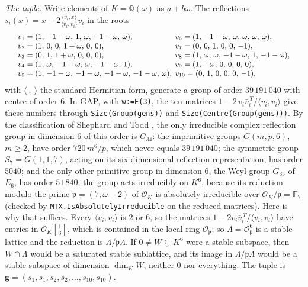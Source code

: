 \documentclass[11pt]{amsart}
\theoremstyle{definition}
\theoremstyle{remark}
\newcommand{\Q}{\mathbb Q}
\begin{document}
\emph{The tuple.} Write elements of $K=\Q(\omega)$ as $a+b\omega$. The reflections $s_i(x)=x-2\frac{\langle v_i,x\rangle}{\langle v_i,v_i\rangle}v_i$ in the roots
\[
\setlength{\arraycolsep}{2pt}\small
\begin{array}{ll}
v_1=(1,\,-1-\omega,\,1,\,\omega,\,-1-\omega,\,\omega), & v_6=(1,\,-1-\omega,\,\omega,\,\omega,\,\omega,\,\omega),\\
v_2=(1,\,0,\,0,\,1+\omega,\,0,\,0), & v_7=(0,\,0,\,1,\,0,\,0,\,-1),\\
v_3=(0,\,1,\,1+\omega,\,0,\,0,\,0), & v_8=(1,\,\omega,\,\omega,\,-1-\omega,\,1,\,-1-\omega),\\
v_4=(1,\,\omega,\,-1-\omega,\,\omega,\,-1-\omega,\,1), & v_9=(1,\,-\omega,\,0,\,0,\,0,\,0),\\
v_5=(1,\,-1-\omega,\,-1-\omega,\,-1-\omega,\,-1-\omega,\,\omega), & v_{10}=(0,\,1,\,0,\,0,\,0,\,-1),
\end{array}
\]
with $\langle\ ,\ \rangle$ the standard Hermitian form, generate a group of order $39\,191\,040$ with centre of order $6$. In GAP, with \texttt{w:=E(3)}, the ten matrices $1-2\,v_i\bar v_i^{\,T}/\langle v_i,v_i\rangle$ give these numbers through \texttt{Size(Group(gens))} and \texttt{Size(Centre(Group(gens)))}. By the classification of Shephard and Todd \cite{ShephardTodd}, the only irreducible complex reflection group in dimension $6$ of this order is $G_{34}$: the imprimitive groups $G(m,p,6)$, $m\ge2$, have order $720\,m^6/p$, which never equals $39\,191\,040$; the symmetric group $S_7=G(1,1,7)$, acting on its six-dimensional reflection representation, has order $5040$; and the only other primitive group in dimension $6$, the Weyl group $G_{35}$ of $E_6$, has order $51\,840$; the group acts irreducibly on $K^6$, because its reduction modulo the prime $\mathfrak p=(7,\omega-2)$ of $\mathcal O_K$ is absolutely irreducible over $\mathcal O_K/\mathfrak p=\mathbb F_7$ (checked by \texttt{MTX.IsAbsolutelyIrreducible} on the reduced matrices). Here is why that suffices. Every $\langle v_i,v_i\rangle$ is $2$ or $6$, so the matrices $1-2v_i\bar v_i^{\,T}/\langle v_i,v_i\rangle$ have entries in $\mathcal O_K[\tfrac13]$, which is contained in the local ring $\mathcal O_{\mathfrak p}$; so $\Lambda=\mathcal O_{\mathfrak p}^6$ is a stable lattice and the reduction is $\Lambda/\mathfrak p\Lambda$. If $0\ne W\subsetneq K^6$ were a stable subspace, then $W\cap\Lambda$ would be a saturated stable sublattice, and its image in $\Lambda/\mathfrak p\Lambda$ would be a stable subspace of dimension $\dim_KW$, neither $0$ nor everything. The tuple is $\mathbf g=(s_1,s_1,s_2,s_2,\dots,s_{10},s_{10})$.
\end{document}

